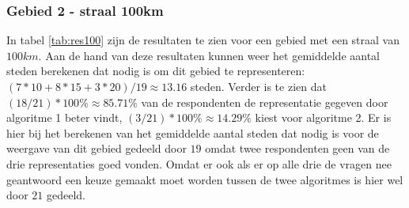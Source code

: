 \documentclass[twoside,openright]{uva-bachelor-thesis}
\begin{document}
			\subsubsection{Gebied 2 - straal 100km}
				In tabel \ref{tab:res100} zijn de resultaten te zien voor een gebied met een straal van $100km$. Aan de hand van deze resultaten kunnen weer het gemiddelde aantal steden berekenen dat nodig is om dit gebied te representeren: $(7 * 10 + 8 * 15 + 3 * 20) / 19 \approx 13.16$ steden. Verder is te zien dat $(18 / 21)  * 100\%\approx 85.71\%$ van de respondenten de representatie gegeven door algoritme 1 beter vindt, $(3 / 21) * 100\% \approx 14.29\%$ kiest voor algoritme 2. Er is hier bij het berekenen van het gemiddelde aantal steden dat nodig is voor de weergave van dit gebied gedeeld door $19$ omdat twee respondenten geen van de drie representaties goed vonden. Omdat er ook als er op alle drie de vragen nee geantwoord een keuze gemaakt moet worden tussen de twee algoritmes is hier wel door $21$ gedeeld.
\end{document}

